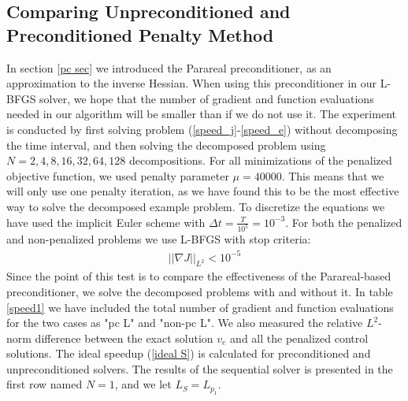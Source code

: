 \subsection{Comparing Unpreconditioned and Preconditioned Penalty Method}
In section \ref{pc sec} we introduced the Parareal preconditioner, as an approximation to the inverse Hessian. When using this preconditioner in our L-BFGS solver, we hope that the number of gradient and function evaluations needed in our algorithm will be smaller than if we do not use it. The experiment is conducted by first solving problem (\ref{speed_j}-\ref{speed_e}) without decomposing the time interval, and then solving the decomposed problem using $N=2,4,8,16,32,64,128$ decompositions. For all minimizations of the penalized objective function, we used penalty parameter $\mu=40000$. This means that we will only use one penalty iteration, as we have found this to be the most effective way to solve the decomposed example problem. To discretize the equations we have used the implicit Euler scheme with $\Delta t= \frac{T}{10^5}=10^{-3}$. For both the penalized and non-penalized problems we use L-BFGS with stop criteria:
\begin{align*}
||\nabla J||_{L^2} <10^{-5}
\end{align*}  
Since the point of this test is to compare the effectiveness of the Parareal-based preconditioner, we solve the decomposed problems with and without it. In table \ref{speed1} we have included the total number of gradient and function evaluations for the two cases as "pc L" and "non-pc L". We also measured the relative $L^2$-norm difference between the exact solution $v_e$ and all the penalized control solutions. The ideal speedup (\ref{ideal S}) is calculated for preconditioned and unpreconditioned solvers. The results of the sequential solver is presented in the first row named $N=1$, and we let $L_S=L_{p_1}$.
\\
